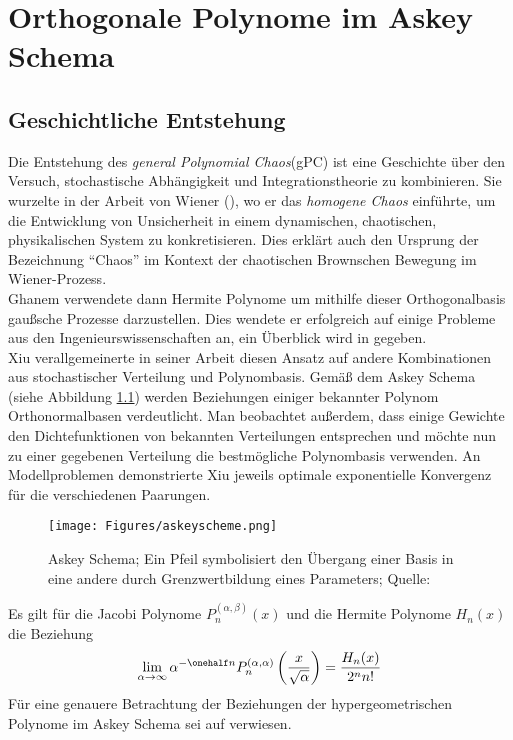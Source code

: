 
\chapter{Orthogonale Polynome im Askey Schema} %

\label{AppendixA} %

\section{Geschichtliche Entstehung}
Die Entstehung des \emph{general Polynomial Chaos}(gPC) ist eine Geschichte über den Versuch, stochastische Abhängigkeit und Integrationstheorie zu kombinieren. Sie wurzelte in der Arbeit von Wiener (\autocite{norbertwiener1938}), wo er das \emph{homogene Chaos} einführte, um die Entwicklung von Unsicherheit in einem dynamischen, chaotischen, physikalischen System zu konkretisieren. Dies erklärt auch den Ursprung der Bezeichnung "`Chaos"' im Kontext der chaotischen Brownschen Bewegung im Wiener-Prozess.\\
Ghanem verwendete dann Hermite Polynome um mithilfe dieser Orthogonalbasis gaußsche Prozesse darzustellen. Dies wendete er erfolgreich auf einige Probleme aus den Ingenieurswissenschaften an, ein Überblick wird in \autocite{GhaSpa91} gegeben.\\
Xiu verallgemeinerte in seiner Arbeit \autocite{xiu2002} diesen Ansatz auf andere Kombinationen aus stochastischer Verteilung und Polynombasis. Gemäß dem Askey Schema (siehe Abbildung \ref{askeyscheme}) werden Beziehungen einiger bekannter Polynom Orthonormalbasen verdeutlicht. Man beobachtet außerdem, dass einige Gewichte den Dichtefunktionen von bekannten Verteilungen entsprechen und möchte nun zu einer gegebenen Verteilung die bestmögliche Polynombasis verwenden. An Modellproblemen demonstrierte Xiu jeweils optimale exponentielle Konvergenz für die verschiedenen Paarungen.\\
\begin{figure}
\center
\texttt{[image: Figures/askeyscheme.png]}
\caption{Askey Schema; Ein Pfeil symbolisiert den Übergang einer Basis in eine andere durch Grenzwertbildung eines Parameters; Quelle: \autocite{webaskey}}
\label{askeyscheme}
\end{figure}
\begin{mathbsp}
Es gilt für die Jacobi Polynome $P_n^{(\alpha,\beta)}(x)$ und die Hermite Polynome $H_n(x)$ die Beziehung
\[\lim\limits_{\alpha\to\infty}\alpha^{-\onehalf n}P_n^{(\alpha,\alpha)}\left(\frac{x}{\sqrt{\alpha}}\right)=\frac{H_n(x)}{2^nn!}\]
Für eine genauere Betrachtung der Beziehungen der hypergeometrischen Polynome im Askey Schema sei auf \autocite{koekoekswart98} verwiesen.
\end{mathbsp}

